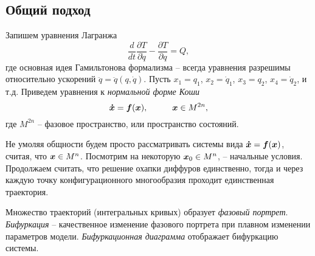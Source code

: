 \subsection*{Общий подход}


Запишем уравнения Лагранжа
\begin{equation*}
    \frac{d }{d t} \frac{\partial T}{\partial \dot{q}} - \frac{\partial T}{\partial q} = Q,
\end{equation*}
где основная идея Гамильтонова формализма -- всегда уравнения разрешимы относительно ускорений $\ddot{q} = \ddot{q} (q, \dot{q})$. Пусть 
$x_1 = q_1$, $x_2 = \dot{q}_1$, $x_3 = q_2$, $x_4 = \dot{q}_2$, и т.д. Приведем уравнения к \textit{нормальной форме Коши} 
\begin{equation*}
    \mbox{\boldmath $\dot{x}$} = \mbox{\boldmath $f$}(\mbox{\boldmath $x$}), \hspace{1 cm}
    \mbox{\boldmath $x$} \in M^{2n},
\end{equation*}
где $M^{2n}$ -- фазовое пространство, или пространство состояний. 

Не умоляя общности будем просто рассматривать системы вида $\mbox{\boldmath $\dot{x}$} = \mbox{\boldmath $f$}(\mbox{\boldmath $x$})$, считая, что $\mbox{\boldmath $x$} \in M^{n}$. Посмотрим на некоторую $\mbox{\boldmath $x$}_0 \in M^n$, -- начальные условия. Продолжаем считать, что решение охапки диффуров единственно, тогда и через каждую точку конфигурационного многообразия проходит единственная траектория.

\begin{to_def}
    Множество траекторий (интегральных кривых) образует \textit{фазовый портрет}.
    \textit{Бифуркация} -- качественное изменение фазового портрета при
    плавном изменении параметров модели. \textit{Бифуркационная диаграмма} отображает бифуркацию системы.
\end{to_def}




